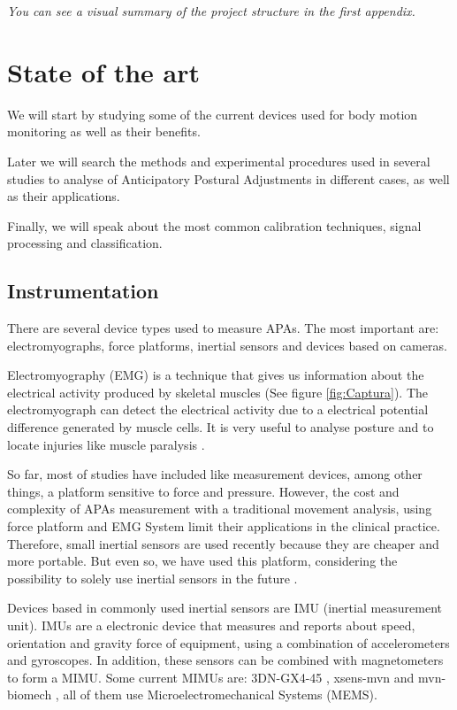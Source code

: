 \textit{You can see a visual summary of the project structure in the first appendix.}

\section{State of the art}

We will start by studying some of the current devices used for body motion monitoring as well as their benefits.

Later we will search the methods and experimental procedures used in several studies to analyse of Anticipatory Postural Adjustments in different cases, as well as their applications.

Finally, we will speak about the most common calibration techniques, signal processing and classification.


\subsection{Instrumentation}

There are several device types used to measure APAs. The most important are: electromyographs, force platforms, inertial sensors and devices based on cameras. 

Electromyography (EMG) is a technique that gives us information about the electrical activity produced by skeletal muscles (See figure \ref{fig:Captura}). The electromyograph can detect  the electrical activity due to a electrical potential difference generated by muscle cells. It is very useful to analyse posture and to locate injuries like muscle paralysis \cite{Marcio2010} \cite{Instr1}. 


So far, most of studies have included like measurement devices, among other things, a platform sensitive to force and pressure. However, the cost and complexity of APAs measurement with a traditional movement analysis, using force platform and EMG System limit their applications in the  clinical practice. Therefore, small inertial sensors are used recently because they are cheaper and more portable. But even so, we have used this platform, considering the possibility to solely use inertial sensors in the future \cite{Mancini2009} \cite{Vennila2011}.

Devices based in commonly used inertial sensors are IMU (inertial measurement unit). IMUs are a electronic device that measures and reports about speed, orientation and gravity force of equipment, using a combination of accelerometers and gyroscopes.
In addition, these sensors can be combined with magnetometers to form a MIMU. Some current MIMUs are: 3DN-GX4-45 \cite{Instr2},  xsens-mvn \cite{Instr3} and mvn-biomech \cite{Instr4}, all of them use Microelectromechanical Systems (MEMS).

